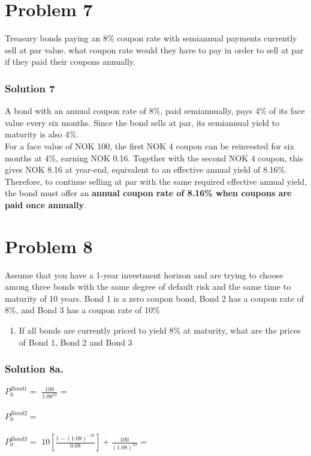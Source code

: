 \documentclass[12]{article}
\begin{document}
\color{black}
\section*{Problem 7}
Treasury bonds paying an 8\% coupon rate with semiannual payments currently sell at par value. what coupon rate would they have to pay in order to sell at par if they paid their coupons annually.

\color{blue}
\subsubsection*{Solution 7}
A bond with an annual coupon rate of 8\%, paid semiannually, pays 4\% of its face value every six months. Since the bond sells at par, its semiannual yield to maturity is also 4\%.\\
For a face value of NOK 100, the first NOK 4 coupon can be reinvested for six months at 4\%, earning NOK 0.16. Together with the second NOK 4 coupon, this gives NOK 8.16 at year-end, equivalent to an effective annual yield of 8.16\%.\\
Therefore, to continue selling at par with the same required effective annual yield, the bond must offer an \textbf{annual coupon rate of 8.16\% when coupons are paid once annually}.





\color{black}
\section*{Problem 8}
Assume that you have a 1-year investment horizon and are trying to choose among three bonds with the same degree of default risk and the same time to maturity of 10 years. Bond 1 is a zero coupon bond, Bond 2 has a coupon rate of 8\%, and Bond 3 has a coupon rate of 10\%
\begin{enumerate}
    \item[a)] If all bonds are currently priced to yield 8\% at maturity, what are the prices of Bond 1, Bond 2 and Bond 3
\end{enumerate}


\color{blue}
\subsubsection*{Solution 8a.}
$P_0^{Bond 1} =$ {\Large $\frac{100}{1.08^{10}}$} = \\
\\
$P_0^{Bond 2} =$ \\
\\
$P_0^{Bond 3} =$ {\Large $10[\frac{1 - (1.08)^{-10}}{0.08}] + \frac{100}{(1.08)^{10}}$} =  \\
\end{document}

